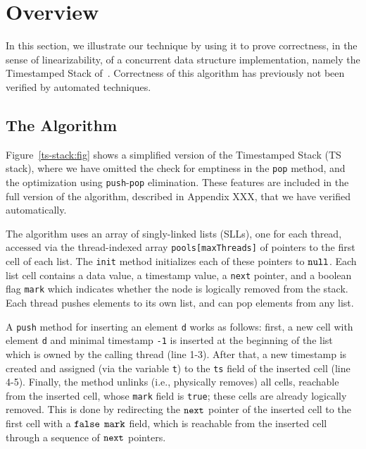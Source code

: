\section{Overview}
\label{sec:overview}

In this section, we illustrate our technique by using it to prove correctness, in
the sense of linearizability, of
a concurrent data structure implementation, namely the Timestamped Stack
of~\cite{ts-stack}. Correctness of this algorithm has previously not been
verified by automated techniques.

\subsection{The Algorithm}



Figure~\ref{ts-stack:fig} shows a simplified version of the Timestamped Stack (TS stack), where we have omitted the check for emptiness in the {\tt pop} method, and the optimization using {\tt push}-{\tt pop} elimination. These features are included in the full version of the algorithm, described in Appendix XXX, that we have verified automatically.

The algorithm uses an array of singly-linked lists (SLLs), one for each thread, accessed via the thread-indexed array {\tt pools[maxThreads]} of pointers to the first cell of each list. The {\tt init} method initializes each of these pointers to ${\tt null}$. Each list cell contains a data value, a timestamp value, a {\tt next} pointer, and a boolean flag {\tt mark} which indicates whether the node is logically removed from the stack. Each thread pushes elements to its own list, and can pop elements from any list.

A {\tt push} method for inserting an element {\tt d} works as follows: first, a new cell with element {\tt d} and minimal timestamp {\tt -1} is inserted at the beginning of the list which is owned by the calling thread (line 1-3). After that, a new timestamp is created and assigned (via the variable {\tt t}) to the {\tt ts} field of the inserted cell (line 4-5).
Finally, the method unlinks (i.e., physically removes) all cells, reachable from the inserted cell, whose {\tt mark} field is {\tt true}; these cells are already logically removed. This is done by redirecting the $\tt next$ pointer of the inserted cell to the first cell with a ${\tt false}$ $\tt mark$ field, which is
reachable from the inserted cell through a sequence of $\tt next$ pointers.


